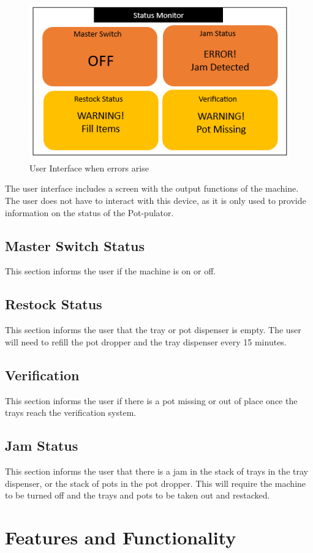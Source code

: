 \documentclass{article}
\begin{document}
  \begin{figure}[H]
    \includegraphics{statusbad.png}
    \caption{User Interface when errors arise}
    \label{fig:scope}
  \end{figure}
The user interface includes a screen with the output functions of the machine. The user does not have to interact with this device, as it is only used to provide information on the status of the Pot-pulator.
\subsection{Master Switch Status}
This section informs the user if the machine is on or off.
\subsection{Restock Status}
This section informs the user that the tray or pot dispenser is empty. The user will need to refill the pot dropper and the tray dispenser every 15 minutes.
\subsection{Verification}
This section informs the user if there is a pot missing or out of place once the trays reach the verification system.
\subsection{Jam Status}
This section informs the user that there is a jam in the stack of trays in the tray dispenser, or the stack of pots in the pot dropper. This will require the machine to be turned off and the trays and pots to be taken out and restacked. 
\newpage
\section{Features and Functionality}
\end{document}

